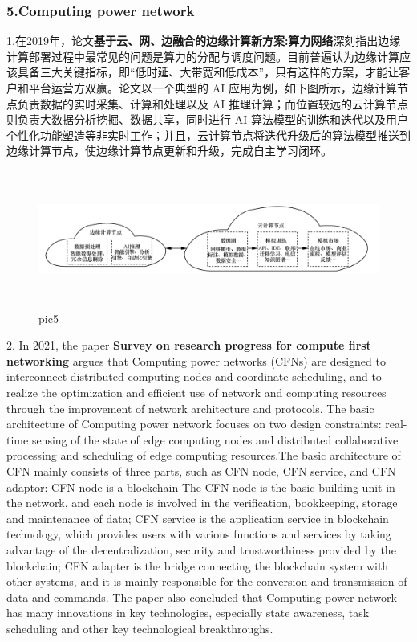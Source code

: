 \documentclass[a4paper,twoside]{scrbook}
\begin{document}
\begin{CJK}{UTF8}{gbsn}
\subsubsection{5.Computing power network}

1.在2019年，论文\textbf{基于云、网、边融合的边缘计算新方案:算力网络}深刻指出边缘计算部署过程中最常见的问题是算力的分配与调度问题。目前普遍认为边缘计算应该具备三大关键指标，即“低时延、大带宽和低成本”，只有这样的方案，才能让客户和平台运营方双赢。论文以一个典型的 AI 应用为例，如下图所示，边缘计算节点负责数据的实时采集、计算和处理以及 AI 推理计算；而位置较远的云计算节点则负责大数据分析挖掘、数据共享，同时进行 AI 算法模型的训练和迭代以及用户个性化功能塑造等非实时工作；并且，云计算节点将迭代升级后的算法模型推送到边缘计算节点，使边缘计算节点更新和升级，完成自主学习闭环。
\begin{figure}
\centering
\includegraphics[height=4.5cm,width=13.5cm]{AI c e.png}
\caption{pic5}
\end{figure}


2. In 2021, the paper \textbf{Survey on research progress for compute first networking}\cite{WXAQ202105001} argues that Computing power networks (CFNs) are designed to interconnect distributed computing nodes and coordinate scheduling, and to realize the optimization and efficient use of network and computing resources through the improvement of network architecture and protocols. The basic architecture of Computing power network focuses on two design constraints: real-time sensing of the state of edge computing nodes and distributed collaborative processing and scheduling of edge computing resources.The basic architecture of CFN mainly consists of three parts, such as CFN node, CFN service, and CFN adaptor: CFN node is a blockchain The CFN node is the basic building unit in the network, and each node is involved in the verification, bookkeeping, storage and maintenance of data; CFN service is the application service in blockchain technology, which provides users with various functions and services by taking advantage of the decentralization, security and trustworthiness provided by the blockchain; CFN adapter is the bridge connecting the blockchain system with other systems, and it is mainly responsible for the conversion and transmission of data and commands. The paper also concluded that Computing power network has many innovations in key technologies, especially state awareness, task scheduling and other key technological breakthroughs.


\end{CJK}
\end{document}
